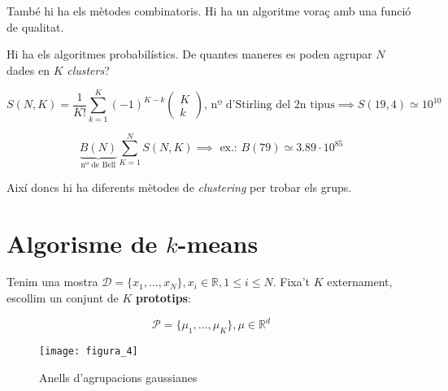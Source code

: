 \documentclass[a4paper]{article}
\begin{document}
També hi ha els mètodes combinatoris. Hi ha un algoritme voraç amb una funció de qualitat.

Hi ha els algoritmes probabilístics. De quantes maneres es poden agrupar $N$ dades en $K$ \emph{clusters}?

$$ S(N, K) = \frac{1}{K!} \sum_{k=1}^K (-1)^{K-k} \begin{pmatrix}
K \\ k
\end{pmatrix} \text{, nº d'Stirling del 2n tipus} \implies S(19,4) \simeq 10^{10} $$

$$ \underbrace{B(N)}_{\text{nº de Bell}} \sum_{K=1}^{N} S(N,K) \implies \text{ ex.: } B(79) \simeq 3.89·10^85 $$

Així doncs hi ha diferents mètodes de \emph{clustering} per trobar els grups.

\section{Algorisme de $k$-means}

Tenim una mostra $\mathcal{D} = \{ x_1,..., x_N \} , x_i \in \mathbb{R}, 1 \le i \le N$. Fixa't $K$ externament, escollim un conjunt de $K$ \textbf{prototips}:

$$ \mathcal{P} = \{ \mu_1, ..., \mu_K \}, \mu \in \mathbb{R}^d $$

\begin{figure}[H]
    \centering
    \texttt{[image: figura\_4]}
    \caption{Anells d'agrupacions gaussianes}
\end{figure}
\end{document}
